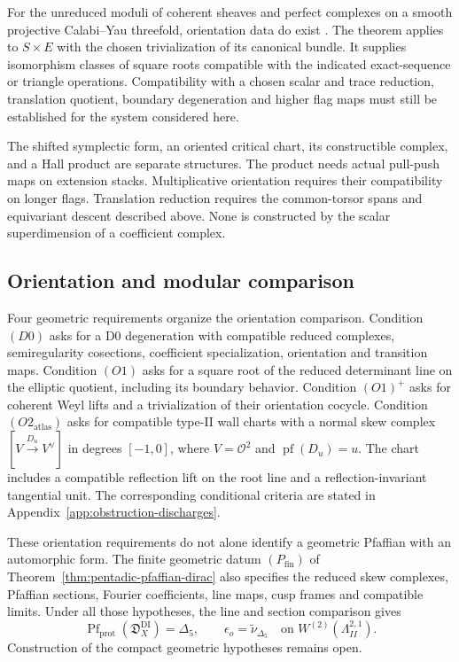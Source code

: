 For the unreduced moduli of coherent sheaves and perfect complexes
on a smooth projective Calabi--Yau threefold, orientation data do
exist \cite[Theorem~4.4]{JoyceUpmeier}.  The theorem applies to
$S\times E$ with the chosen trivialization of its canonical bundle.
It supplies isomorphism classes of square roots compatible with
the indicated exact-sequence or triangle operations.  Compatibility
with a chosen scalar and trace reduction, translation quotient,
boundary degeneration and higher flag maps must still be established
for the system considered here.

\begin{remark}
\label{rem:source-interface-external-assumptions}
The shifted symplectic form, an oriented critical chart, its
constructible complex, and a Hall product are separate structures.
The product needs actual pull-push maps on extension stacks.
Multiplicative orientation requires their compatibility on longer
flags.  Translation reduction requires the common-torsor spans and
equivariant descent described above.  None is constructed by the
scalar superdimension of a coefficient complex.
\end{remark}

\subsection{Orientation and modular comparison}
\label{sec:k3xe-four-obstructions}

Four geometric requirements organize the orientation comparison.
Condition $(D0)$ asks for a D0 degeneration with compatible reduced
complexes, semiregularity cosections, coefficient specialization,
orientation and transition maps.  Condition $(O1)$ asks for a square
root of the reduced determinant line on the elliptic quotient,
including its boundary behavior.  Condition $(O1)^+$ asks for coherent
Weyl lifts and a trivialization of their orientation cocycle.
Condition $(O2_{\mathrm{atlas}})$ asks for compatible type-II wall
charts with a normal skew complex
\([V\xrightarrow{D_u}V^\vee]\) in degrees \([-1,0]\), where
\(V=\mathcal O^2\) and \(\operatorname{pf}(D_u)=u\).
The chart includes a compatible reflection lift on the root line
and a reflection-invariant tangential unit.
The corresponding conditional criteria are stated in
Appendix~\ref{app:obstruction-discharges}.

These orientation requirements do not alone identify a geometric
Pfaffian with an automorphic form.  The finite geometric datum
$(P_{\mathrm{fin}})$ of
Theorem~\ref{thm:pentadic-pfaffian-dirac} also specifies the reduced
skew complexes, Pfaffian sections, Fourier coefficients, line maps,
cusp frames and compatible limits.  Under all those hypotheses, the
line and section comparison gives
\[
\operatorname{Pf}_{\mathrm{prot}}(\mathfrak D_X^{\mathrm{DI}})
=\Delta_5,
\qquad \epsilon_o=\widetilde\nu_{\Delta_5}
\quad\text{on }W^{(2)}(\Lambda_{II}^{2,1}).
\]
Construction of the compact geometric hypotheses remains open.

